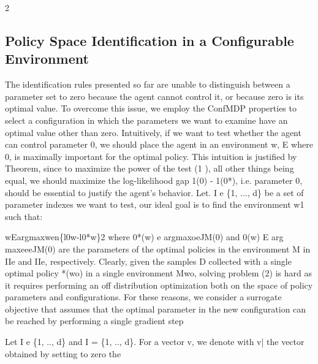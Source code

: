 \documentclass{article}
\begin{document}
\begin{paracol}{2}
\subsection*{Policy Space Identification in a Configurable
Environment}


The identification rules presented so far are unable to distinguish between a parameter set to zero because the agent
cannot control it, or because zero is its optimal value. To
overcome this issue, we employ the ConfMDP properties
to select a configuration in which the parameters we want to
examine have an optimal value other than zero. Intuitively, if
we want to test whether the agent can control parameter 0,
we should place the agent in an environment w, E  where
0, is maximally important for the optimal policy. This intuition is justified by Theorem, since to maximize the power
of the test (1  ), all other things being equal, we should
maximize the log-likelihood gap 1(0) - 1(0*), i.e. parameter 0, should be essential to justify the agent's behavior. Let.
I e \{1, ..., d\} be a set of parameter indexes we want to test,
our ideal goal is to find the environment w1 such that:


wEargmaxwen\{l0w-l0*w\}2
where 0*(w) e argmaxoeJM(0) and 0(w) E
arg maxeeeJM(0) are the parameters of the optimal
policies in the environment M in IIe and IIe, respectively. Clearly, given the samples D collected with a single optimal policy *(wo) in a single environment Mwo,
solving problem (2) is hard as it requires performing an off
distribution optimization both on the space of policy parameters and configurations. For these reasons, we consider a
surrogate objective that assumes that the optimal parameter
in the new configuration can be reached by performing a single gradient step


Let I e \{1, .., d\} and I = \{1, .., d\}\I. For a vector v, we
denote with v| the vector obtained by setting to zero the

\end{paracol}
\end{document}
